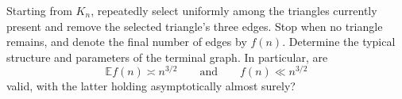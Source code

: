 Starting from $K_n$, repeatedly select uniformly among the triangles currently present and remove the selected triangle's three edges. Stop when no triangle remains, and denote the final number of edges by $f(n)$. Determine the typical structure and parameters of the terminal graph. In particular, are
\[
\mathbb E f(n)\asymp n^{3/2}\qquad\text{and}\qquad f(n)\ll n^{3/2}
\]
valid, with the latter holding asymptotically almost surely?
